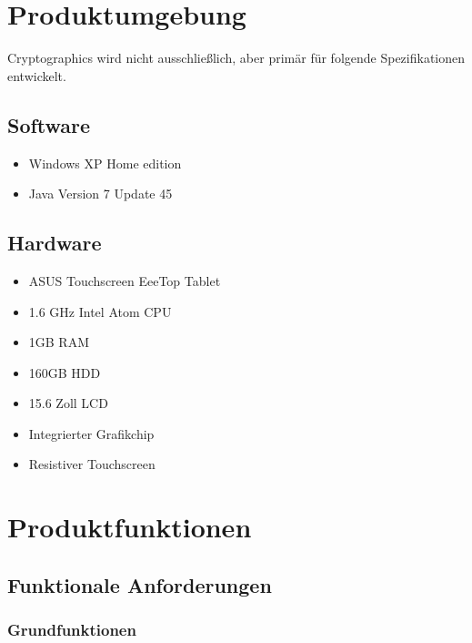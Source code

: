 \documentclass{article}
\begin{document}
\section{Produktumgebung}

Cryptographics wird nicht ausschließlich, aber primär für folgende Spezifikationen entwickelt.

\subsection{Software}

\begin{itemize}
	\item Windows XP Home edition
	\item Java Version 7 Update 45
\end{itemize}

\subsection{Hardware}

\begin{itemize}
	\item ASUS Touchscreen EeeTop Tablet
	\item 1.6 GHz Intel Atom CPU
	\item 1GB RAM
	\item 160GB HDD
	\item 15.6 Zoll LCD
	\item Integrierter Grafikchip
	\item Resistiver Touchscreen
\end{itemize}

\section{Produktfunktionen}

\subsection{Funktionale Anforderungen}

\subsubsection{Grundfunktionen}
\end{document}
